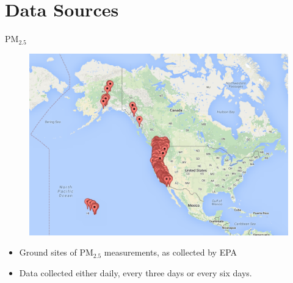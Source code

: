 \documentclass[notheorems,envcountsect,allowframebreaks,xcolor=svgnames,8pt]{beamer}
\begin{document}
\section{Data Sources}
\begin{frame}{PM$_{2.5}$ }
\begin{figure}
\centering
\includegraphics[scale=0.3]{AllPMsites} \hspace{0.4mm}
\end{figure}

\begin{itemize}	
\item Ground sites of PM$_{2.5}$ measurements, as collected by EPA
\item Data collected either daily, every three days or every six days.
\end{itemize}	
\end{frame}
\end{document}
